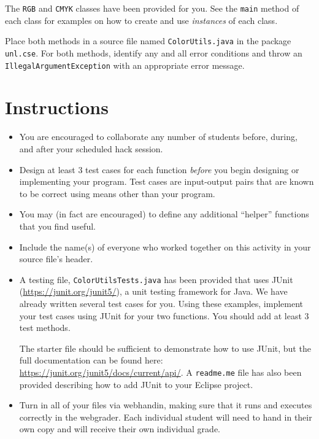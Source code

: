 \documentclass[12pt]{scrartcl}
\begin{document}
The \texttt{RGB} and \texttt{CMYK} classes have 
been provided for you.  See the \texttt{main} method of 
each class for examples on how to create and use \emph{instances} 
of each class.

Place both methods in a source file named \texttt{ColorUtils.java}
in the package \texttt{unl.cse}.  For both methods, identify any and 
all error conditions and throw an \texttt{IllegalArgumentException} 
with an appropriate error message.


\section*{Instructions}

\begin{itemize}
  \item You are encouraged to collaborate any number of students 
  before, during, and after your scheduled hack session.  
  \item Design at least 3 test cases for each function
  \emph{before} you begin
  designing or implementing your program.  Test cases are 
  input-output pairs that are known to be correct using means
  other than your program.
  \item You may (in fact are encouraged) to define any additional
  ``helper'' functions that you find useful.
  \item Include the name(s) of everyone who worked together on
  this activity in your source file's header.

  \item A testing file, \texttt{ColorUtilsTests.java} has been 
  provided that uses JUnit (\url{https://junit.org/junit5/}), a unit testing 
  framework for Java.  We have already written several test cases 
  for you.  Using these examples, implement your test cases using JUnit
  for your two functions.  You should add at least 3 test methods.

  The starter file should be sufficient to demonstrate how to use
  JUnit, but the full documentation can be found here: 
  \url{https://junit.org/junit5/docs/current/api/}.
  A \texttt{readme.me} file has also been provided describing
  how to add JUnit to your Eclipse project.   
  
  \item Turn in all of your files via webhandin, making sure that 
  it runs and executes correctly in the webgrader.  Each individual 
  student will need to hand in their own copy and will receive 
  their own individual grade.
\end{itemize}  
\end{document}
